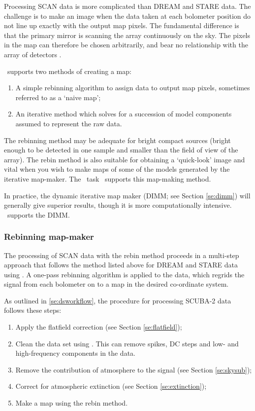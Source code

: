\documentclass[oneside,11pt]{starlink}
\begin{document}
Processing SCAN data is more complicated than DREAM and STARE data.
The challenge is to make an image when the data taken at each
bolometer position do not line up exactly with the output map
pixels. The fundamental difference is that the primary mirror is
scanning the array continuously on the sky. The pixels in the map can
therefore be chosen arbitrarily, and bear no relationship with the
array of detectors \cite{sc2ana001,sc2ana005,sc2ana006}.

\SMURF\ supports two methods of creating a map:
\begin{enumerate}
\item A simple rebinning algorithm to assign data to output map
  pixels, sometimes referred to as a `naive map';
\item An iterative method which solves for a succession of model
  components assumed to represent the raw data.
\end{enumerate}

The rebinning method may be adequate for bright compact sources
(bright enough to be detected in one sample and smaller than the field
of view of the array). The rebin method is also suitable for obtaining
a `quick-look' image and vital when you wish to make maps of some of
the models generated by the iterative map-maker. The \SMURF\ task
\makemap\ supports this map-making method.

In practice, the dynamic iterative map maker (DIMM; see Section
\ref{se:dimm}) will generally give superior results, though it is more
computationally intensive. \makemap\ supports the DIMM.

\subsubsection{Rebinning map-maker\label{se:rebin}}

The processing of SCAN data with the rebin method proceeds in a
multi-step approach that follows the method listed above for DREAM and
STARE data using \makemap. A one-pass rebinning algorithm is applied
to the data, which regrids the signal from each bolometer on to a map
in the desired co-ordinate system.

As outlined in \ref{se:dsworkflow}, the procedure for processing
SCUBA-2 data follows these steps:
\begin{enumerate}
\item Apply the flatfield correction (see Section \ref{se:flatfield});
\item Clean the data set using \clean. This can remove spikes, DC
  steps and low- and high-frequency components in the data.
\item Remove the contribution of atmosphere to the signal (see Section
  \ref{se:skysub});
\item Correct for atmospheric extinction (see Section
  \ref{se:extinction});
\item Make a map using the rebin method.
\end{enumerate}
\end{document}
